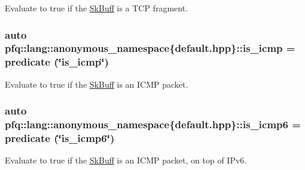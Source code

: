 Evaluate to {\ttfamily true} if the \hyperlink{structpfq_1_1lang_1_1SkBuff}{Sk\+Buff} is a T\+CP fragment. 

\subsubsection[{\texorpdfstring{is\+\_\+icmp}{is_icmp}}]{\setlength{\rightskip}{0pt plus 5cm}auto pfq\+::lang\+::anonymous\+\_\+namespace\{default.\+hpp\}\+::is\+\_\+icmp = {\bf predicate} (\char`\"{}is\+\_\+icmp\char`\"{})}\hypertarget{namespacepfq_1_1lang_1_1anonymous__namespace_02default_8hpp_03_a01ccba89c8582ba423393226b54f12de}{}\label{namespacepfq_1_1lang_1_1anonymous__namespace_02default_8hpp_03_a01ccba89c8582ba423393226b54f12de}


Evaluate to {\ttfamily true} if the \hyperlink{structpfq_1_1lang_1_1SkBuff}{Sk\+Buff} is an I\+C\+MP packet. 

\subsubsection[{\texorpdfstring{is\+\_\+icmp6}{is_icmp6}}]{\setlength{\rightskip}{0pt plus 5cm}auto pfq\+::lang\+::anonymous\+\_\+namespace\{default.\+hpp\}\+::is\+\_\+icmp6 = {\bf predicate} (\char`\"{}is\+\_\+icmp6\char`\"{})}\hypertarget{namespacepfq_1_1lang_1_1anonymous__namespace_02default_8hpp_03_a01d6e9764945cc33a11f3ce6a9925549}{}\label{namespacepfq_1_1lang_1_1anonymous__namespace_02default_8hpp_03_a01d6e9764945cc33a11f3ce6a9925549}


Evaluate to {\ttfamily true} if the \hyperlink{structpfq_1_1lang_1_1SkBuff}{Sk\+Buff} is an I\+C\+MP packet, on top of I\+Pv6. 

